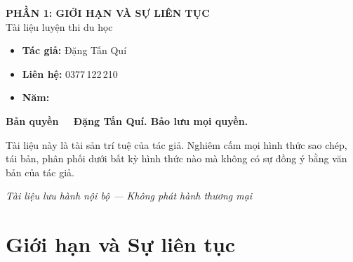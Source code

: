 \documentclass[12pt,a4paper]{article}
\begin{document}
\newpage

\thispagestyle{empty}
\vspace*{5cm}
\begin{center}
  {\Large\bfseries PHẦN 1: GIỚI HẠN VÀ SỰ LIÊN TỤC}\\[8pt]
  {\large Tài liệu luyện thi du học}
\end{center}

\vspace{2cm}

\begin{tcolorbox}[
  enhanced, colback=red!3!white, colframe=red!60!black,
  fonttitle=\bfseries, title={Thông tin bản quyền},
  boxrule=1.5pt
]
  \begin{itemize}[leftmargin=*]
    \item \textbf{Tác giả:} Đặng Tấn Quí
    \item \textbf{Liên hệ:} 0377\,122\,210
    \item \textbf{Năm:} \the\year
  \end{itemize}

  \vspace{8pt}
  \textbf{Bản quyền \textcopyright\ \the\year\ Đặng Tấn Quí. Bảo lưu mọi quyền.}

  \vspace{6pt}
  Tài liệu này là tài sản trí tuệ của tác giả. Nghiêm cấm mọi hình thức sao chép, tái bản, phân phối dưới bất kỳ hình thức nào mà không có sự đồng ý bằng văn bản của tác giả.
\end{tcolorbox}

\vfill
\begin{center}
  \small\textit{Tài liệu lưu hành nội bộ --- Không phát hành thương mại}
\end{center}

\newpage

\tableofcontents
\newpage

\section{Giới hạn và Sự liên tục}

\end{document}
